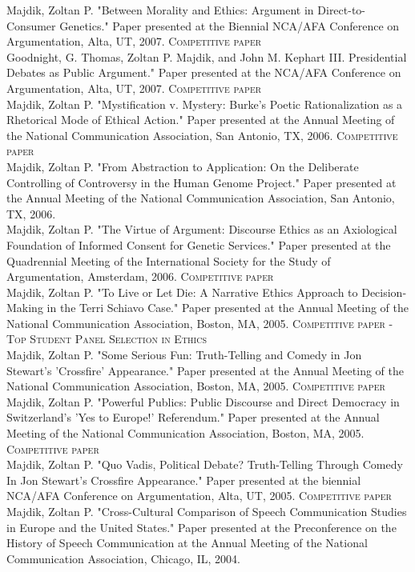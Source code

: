 \documentclass[10pt, a4paper]{article}
\newcommand{\years}[1]{\marginnote{\scriptsize #1}}
\begin{document}
\years{2007}Majdik, Zoltan P. "Between Morality and Ethics: Argument in
Direct-to-Consumer Genetics." Paper presented at the Biennial NCA/AFA
Conference on Argumentation, Alta, UT, 2007. \textsc{Competitive paper}\\
\years{2007}Goodnight, G. Thomas, Zoltan P. Majdik, and John M. Kephart III. Presidential Debates as Public Argument." Paper presented at the NCA/AFA
Conference on Argumentation, Alta, UT, 2007. \textsc{Competitive paper}\\
\years{2006}Majdik, Zoltan P. "Mystification v. Mystery: Burke's Poetic
Rationalization as a Rhetorical Mode of Ethical Action." Paper presented at the
Annual Meeting of the National Communication Association, San Antonio, TX, 2006.
\textsc{Competitive paper}\\
\years{2006}Majdik, Zoltan P. "From Abstraction to Application: On the
Deliberate Controlling of Controversy in the Human Genome Project." Paper
presented at the Annual Meeting of the National Communication Association, San
Antonio, TX, 2006.\\
\years{2006}Majdik, Zoltan P. "The Virtue of Argument: Discourse Ethics
as an Axiological Foundation of Informed Consent for Genetic Services." Paper
presented at the Quadrennial Meeting of the International Society for the Study
of Argumentation, Amsterdam, 2006. \textsc{Competitive paper}\\
\years{2005}Majdik, Zoltan P. "To Live or Let Die: A Narrative Ethics
Approach to Decision-Making in the Terri Schiavo Case." Paper presented at the
Annual Meeting of the National Communication Association, Boston, MA, 2005.
\textsc{Competitive paper - Top Student Panel Selection in Ethics}\\
\years{2005}Majdik, Zoltan P. "Some Serious Fun: Truth-Telling and Comedy
in Jon Stewart's 'Crossfire' Appearance." Paper presented at the Annual Meeting of
the National Communication Association, Boston, MA, 2005. \textsc{Competitive paper}\\
\years{2005}Majdik, Zoltan P. "Powerful Publics: Public Discourse and
Direct Democracy in Switzerland's 'Yes to Europe!' Referendum." Paper presented
at the Annual Meeting of the National Communication Association, Boston, MA,
2005. \textsc{Competitive paper}\\
\years{2005}Majdik, Zoltan P. "Quo Vadis, Political Debate? Truth-Telling
Through Comedy In Jon Stewart’s Crossfire Appearance." Paper presented at the
biennial NCA/AFA Conference on Argumentation, Alta, UT, 2005. \textsc{Competitive
paper}\\
\years{2004}Majdik, Zoltan P. "Cross-Cultural Comparison of Speech
Communication Studies in Europe and the United States." Paper presented at the
Preconference on the History of Speech Communication at the Annual Meeting of
the National Communication Association, Chicago, IL, 2004.\\
\years{2004}
\end{document}
